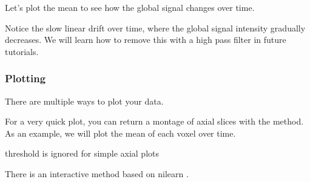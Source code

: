 \documentclass[letterpaper,10pt,english]{sphinxmanual}
\begin{document}
Let’s plot the mean to see how the global signal changes over time.

\begin{sphinxVerbatim}[commandchars=\\\{\}]
\end{sphinxVerbatim}

\begin{sphinxVerbatim}
\end{sphinxVerbatim}

\noindent{}

Notice the slow linear drift over time, where the global signal intensity gradually decreases. We will learn how to remove this with a high pass filter in future tutorials.


\subsubsection{Plotting}
\label{\detokenize{content/Introduction_to_Neuroimaging_Data:plotting}}
There are multiple ways to plot your data.

For a very quick plot, you can return a montage of axial slices with the  method. As an example, we will plot the mean of each voxel over time.

\begin{sphinxVerbatim}[commandchars=\\\{\}]
  
\end{sphinxVerbatim}

\begin{sphinxVerbatim}[commandchars=\\\{\}]
threshold is ignored for simple axial plots
\end{sphinxVerbatim}

\noindent{}

There is an interactive  method based on nilearn .

\begin{sphinxVerbatim}[commandchars=\\\{\}]
\end{sphinxVerbatim}
\end{document}
